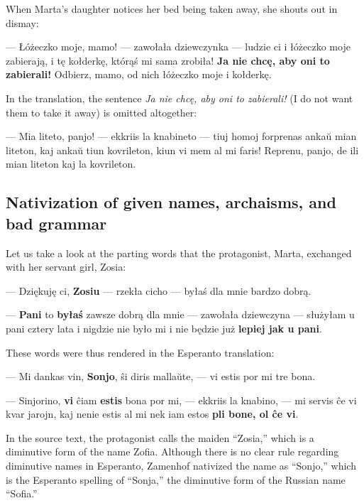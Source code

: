 When Marta's daughter notices her bed being taken away, she shouts out in dismay:

\begin{displayquote}
--- Łóżeczko moje, mamo! --- zawołała dziewczynka --- ludzie ci i łóżeczko moje zabierają, i tę kołderkę, którąś mi sama zrobiła! \textbf{Ja nie chcę, aby oni to zabierali!} Odbierz, mamo, od nich łóżeczko moje i kołderkę.
\end{displayquote}

In the translation, the sentence \textit{Ja nie chcę, aby oni to zabierali!} (I do not want them to take it away) is omitted altogether:

\begin{displayquote}
--- Mia liteto, panjo! --- ekkriis la knabineto --- tiuj homoj forprenas ankaŭ mian liteton, kaj ankaŭ tiun kovrileton, kiun vi mem al mi faris! Reprenu, panjo, de ili mian liteton kaj la kovrileton.
\end{displayquote}

\subsection{Nativization of given names, archaisms, and bad grammar}

Let us take a look at the parting words that the protagonist, Marta, exchanged with her servant girl, Zosia:

\begin{displayquote}
--- Dziękuję ci, \textbf{Zosiu} --- rzekła cicho --- byłaś dla mnie bardzo dobrą.

--- \textbf{Pani} to \textbf{byłaś} zawsze dobrą dla mnie --- zawołała dziewczyna --- służyłam u pani cztery lata i nigdzie nie było mi i nie będzie już \textbf{lepiej jak u pani}.
\end{displayquote}

These words were thus rendered in the Esperanto translation:

\begin{displayquote}
--- Mi dankas vin, \textbf{Sonjo}, ŝi diris mallaŭte, --- vi estis por mi tre bona.

--- Sinjorino, \textbf{vi} ĉiam \textbf{estis} bona por mi, --- ekkriis la knabino, --- mi servis ĉe vi kvar jarojn, kaj nenie estis al mi nek iam estos \textbf{pli bone, ol ĉe vi}.
\end{displayquote}

In the source text, the protagonist calls the maiden ``Zosia,'' which is a diminutive form of the name Zofia.
Although there is no clear rule regarding diminutive names in Esperanto, Zamenhof nativized the name as ``Sonjo,'' which is the Esperanto spelling of ``Sonja,'' the diminutive form of the Russian name ``Sofia.''

